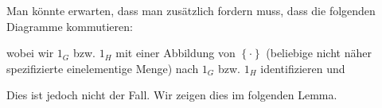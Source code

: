 \documentclass[10pt]{scrbook}
\begin{document}
\begin{Bem}
Man könnte erwarten, dass man zusätzlich fordern muss, dass die folgenden Diagramme kommutieren:

\begin{xy}
\end{xy}wobei wir $1_G$ bzw. $1_H$ mit einer Abbildung von $\left\{\cdot\right\}$ (beliebige nicht näher spezifizierte einelementige Menge) nach $1_G$ bzw. $1_H$ identifizieren und

\begin{xy}
\end{xy}

Dies ist jedoch nicht der Fall. Wir zeigen dies im folgenden Lemma.
\end{Bem}
\end{document}
